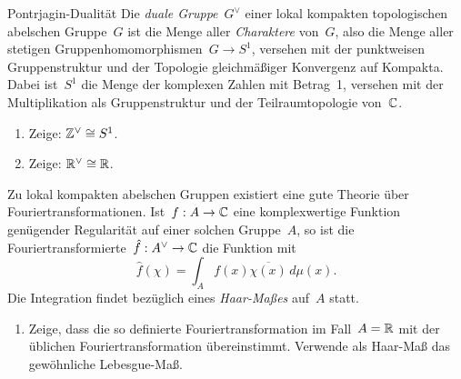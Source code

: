 \documentclass{uebblatt}
\begin{document}
\begin{aufgabe}{Pontrjagin-Dualität}
Die \emph{duale Gruppe}~$G^\vee$ einer lokal kompakten topologischen abelschen
Gruppe~$G$ ist die Menge aller \emph{Charaktere} von~$G$, also die Menge aller
stetigen Gruppenhomomorphismen~$G \to S^1$, versehen mit der punktweisen
Gruppenstruktur und der Topologie gleichmäßiger Konvergenz auf Kompakta.
Dabei ist~$S^1$ die Menge der komplexen Zahlen mit Betrag~1, versehen mit der
Multiplikation als Gruppenstruktur und der Teilraumtopologie von~$\mathbb{C}$.

\begin{enumerate}
\item Zeige: $\mathbb{Z}^\vee \cong S^1$.
\item Zeige: $\mathbb{R}^\vee \cong \mathbb{R}$.
\end{enumerate}

Zu lokal kompakten abelschen Gruppen existiert eine gute
Theorie über Fouriertransformationen. Ist~$f : A \to \mathbb{C}$ eine komplexwertige
Funktion genügender Regularität auf einer solchen Gruppe~$A$, so ist die
Fouriertransformierte~$\hat f : A^\vee \to \mathbb{C}$ die Funktion mit
\[ \hat f(\chi) = \int_A f(x) \overline{\chi(x)} \,d\mu(x). \]
Die Integration findet bezüglich eines \emph{Haar-Maßes} auf~$A$ statt.

\begin{enumerate}
\addtocounter{enumi}{2}
\item Zeige, dass die so definierte Fouriertransformation im Fall~$A = \mathbb{R}$ mit
der üblichen Fouriertransformation übereinstimmt. Verwende als
Haar-Maß das gewöhnliche Lebesgue-Maß.
\end{enumerate}
\end{aufgabe}
\end{document}
